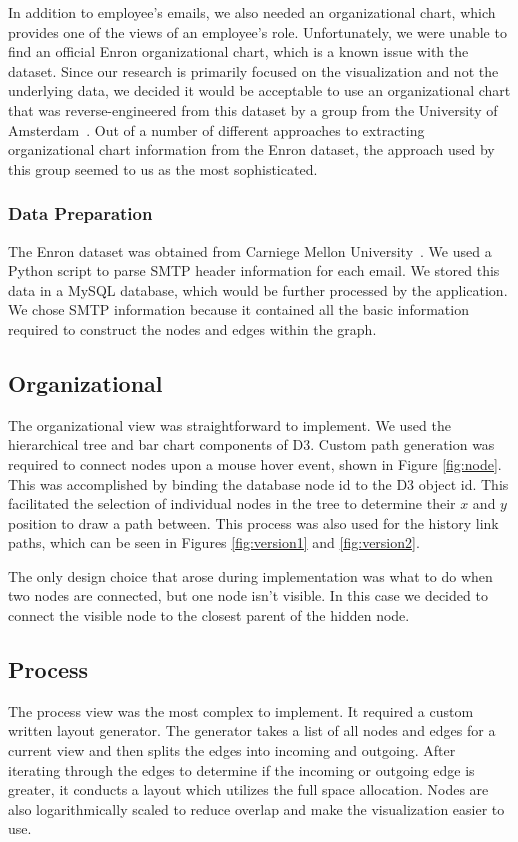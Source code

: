 \documentclass[journal]{vgtc}                %
\begin{document}
In addition to employee's emails, we also needed an organizational chart, which provides one of the views of an employee's role.  Unfortunately, we were unable to find an official Enron organizational chart, which is a known issue with the dataset.  Since our research is primarily focused on the visualization and not the underlying data, we decided it would be acceptable to use an organizational chart that was reverse-engineered from this dataset by a group from the University of Amsterdam~\cite{rowe2007automated}. Out of a number of different approaches to extracting organizational chart information from the Enron dataset, the approach used by this group seemed to us as the most sophisticated.

\subsubsection{Data Preparation}

The Enron dataset was obtained from Carniege Mellon University~\cite{cmuenron}.  We used a Python script to parse SMTP header information for each email.  We stored this data in a MySQL database, which would be further processed by the application. We chose SMTP information because it contained all the basic information required to construct the nodes and edges within the graph.

\subsection{Organizational}
The organizational view was straightforward to implement. We used the hierarchical tree and bar chart components of D3.  Custom path generation was required to connect nodes upon a mouse hover event, shown in Figure \ref{fig:node}.  This was accomplished by binding the database node id to the D3 object id.  This facilitated the selection of individual nodes in the tree to determine their $x$ and $y$ position to draw a path between.  This process was also used for the history link paths, which can be seen in Figures \ref{fig:version1} and \ref{fig:version2}.

The only design choice that arose during implementation was what to do when two nodes are connected, but one node isn't visible.  In this case we decided to connect the visible node to the closest parent of the hidden node.

\subsection{Process}
The process view was the most complex to implement.  It required a custom written layout generator.  The generator takes a list of all nodes and edges for a current view and then splits the edges into incoming and outgoing.  After iterating through the edges to determine if the incoming or outgoing edge is greater, it conducts a layout which utilizes the full space allocation.  Nodes are also logarithmically scaled to reduce overlap and make the visualization easier to use.
\end{document}
